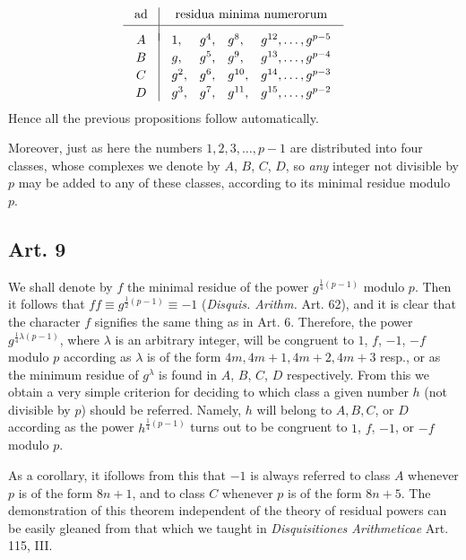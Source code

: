 \documentclass{book}
\theoremstyle{plain}
\theoremstyle{remark}
\begin{document}
\[ \begin{array}{c|c}
\textrm{ad} & \textrm{ residua minima numerorum }  \\[2pt]
\hline \\[-6pt]
\begin{array}{c} A \\[2pt] B \\[2pt] C \\[2pt] D \end{array} & \begin{array}{lllll} 1, &g^4, &g^8, &g^{12}, \dots, g^{p-5}  \\[2pt]
 g, &g^5, &g^9, &g^{13}, \dots, g^{p-4}  \\[2pt]
 g^2, &g^6, &g^{10}, &g^{14}, \dots, g^{p-3}  \\[2pt]
 g^3, &g^7, &g^{11}, &g^{15}, \dots, g^{p-2}  
\end{array} \end{array}
\] 
Hence all the previous propositions follow automatically.  

Moreover, just as here the numbers $1,2,3,\dots,p-1$ are distributed into four classes, whose complexes we denote by $A$, $B$, $C$, $D$, so \textit{any} integer not divisible by $p$ may be added to any of these classes, according to its minimal residue modulo $p$. 

\subsection*{Art. 9} 

We shall denote by $f$ the minimal residue of the power $g^{\frac{1}{4}(p-1)}$ modulo $p$.  Then it follows that $ff \equiv g^{\frac{1}{2}(p-1)} \equiv -1$ (\textit{Disquis. Arithm. }Art. 62), and it is clear that the character $f$ signifies the same thing as in Art. 6. Therefore, the power $g^{\frac{1}{4}\lambda(p-1)}$, where $\lambda$ is an arbitrary integer, will be congruent to $1$, $f$, $-1$, $-f$ modulo $p$ according as $\lambda$ is of the form $4m, 4m+1, 4m+2, 4m+3$ resp., or as the minimum residue of $g^{\lambda}$ is found in $A$, $B$, $C$, $D$ respectively.  From this we obtain a very simple criterion for deciding to which class a given number $h$ (not divisible by $p$) should be referred.  Namely, $h$ will belong to $A, B, C$, or $D$ according as the power $h^{\frac{1}{4}(p-1)}$ turns out to be congruent to $1$, $f$, $-1$, or $-f$ modulo $p$.

As a corollary, it ifollows from this that $-1$ is always referred to class $A$ whenever $p$ is of the form $8n+1$, and to class $C$ whenever $p$ is of the form $8n+5$.  The demonstration of this theorem independent of the theory of residual powers can be easily gleaned from that which we taught in \textit{Disquisitiones Arithmeticae} Art. 115, III.  
\end{document}
